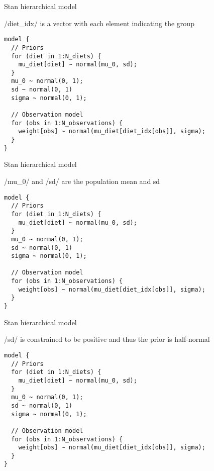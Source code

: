 \documentclass[finnish,english,t]{beamer}
\begin{document}
\begin{frame}[fragile]{Stan hierarchical model}

  \vspace{-0.5\baselineskip}

\rinline/diet_idx/ is a vector with each element indicating the group

\vspace{-0.5\baselineskip}
{\small
\begin{verbatim}
model {
  // Priors
  for (diet in 1:N_diets) {
    mu_diet[diet] ~ normal(mu_0, sd);
  }
  mu_0 ~ normal(0, 1);
  sd ~ normal(0, 1)
  sigma ~ normal(0, 1);
  
  // Observation model
  for (obs in 1:N_observations) {
    weight[obs] ~ normal(mu_diet[diet_idx[obs]], sigma);
  }
}
\end{verbatim}
}
\end{frame}

\begin{frame}[fragile]{Stan hierarchical model}

  \vspace{-0.5\baselineskip}

\rinline/mu_0/ and \rinline/sd/ are the population mean and sd
  
\vspace{-0.5\baselineskip}
{\small
\begin{verbatim}
model {
  // Priors
  for (diet in 1:N_diets) {
    mu_diet[diet] ~ normal(mu_0, sd);
  }
  mu_0 ~ normal(0, 1);
  sd ~ normal(0, 1)
  sigma ~ normal(0, 1);
  
  // Observation model
  for (obs in 1:N_observations) {
    weight[obs] ~ normal(mu_diet[diet_idx[obs]], sigma);
  }
}
\end{verbatim}
}
\end{frame}

\begin{frame}[fragile]{Stan hierarchical model}

  \vspace{-0.5\baselineskip}

\rinline/sd/ is constrained to be positive and thus the prior is half-normal
  
\vspace{-0.5\baselineskip}
{\small
\begin{verbatim}
model {
  // Priors
  for (diet in 1:N_diets) {
    mu_diet[diet] ~ normal(mu_0, sd);
  }
  mu_0 ~ normal(0, 1);
  sd ~ normal(0, 1)
  sigma ~ normal(0, 1);
  
  // Observation model
  for (obs in 1:N_observations) {
    weight[obs] ~ normal(mu_diet[diet_idx[obs]], sigma);
  }
}
\end{verbatim}
}
\end{frame}
\end{document}
